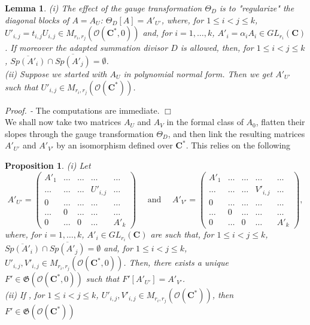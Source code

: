 \documentclass[english]{smfart}
\newtheorem{lemma}[thm]{Lemma}
\newtheorem{prop}[thm]{Proposition}
\numberwithin{equation}{thm}
\def \Pr {\textsl{Proof. - }}
\def\C{{\mathbf C}}
\def\G{{\mathfrak{G}}}
\def\Rw{{\mathcal{O}(\C^{*})}}
\def\Rwg{{\mathcal{O}(\C^{*},0)}}
\def\Th{\Theta}
\begin{document}
\begin{lemma}
(i) The effect of the gauge transformation $\Th_{D}$ is to 
"regularize" the diagonal blocks of $A = A_{U}$:
$\Th_{D}[A] = A'_{U'}$, where, for $1 \leq i < j \leq k$, 
$U'_{i,j} = t_{i,j} U_{i,j} \in M_{r_{i},r_{j}}(\Rwg)$
and, for $i = 1,\ldots,k$, $A'_{i} = \alpha_{i} A_{i} \in GL_{r_{i}}(\C)$.
If moreover the adapted summation divisor $D$ is allowed, then,
for $1 \leq i < j \leq k$, 
$\overline{Sp(A'_{i})} \cap \overline{Sp(A'_{j})} = \emptyset$. \\
(ii) Suppose we started with $A_{U}$ in polynomial normal form.
Then we get $A'_{U'}$ such that $U'_{i,j} \in M_{r_{i},r_{j}}(\Rw)$.
\end{lemma}

\Pr 
The computations are immediate.
\hfill $\Box$ \\

We shall now take two matrices $A_{U}$ and $A_{V}$ in the formal
class of $A_{0}$, flatten their slopes through the gauge transformation
$\Th_{D}$, and then link the resulting matrices $A'_{U'}$ and $A'_{V'}$ 
by an isomorphism defined over $\C^{*}$. This relies on the following

\begin{prop}
(i) Let
$$
A'_{U'} = \begin{pmatrix}
A'_{1}  & \ldots & \ldots & \ldots & \ldots \\
\ldots & \ldots & \ldots  & U'_{i,j} & \ldots \\
0      & \ldots & \ldots   & \ldots & \ldots \\
\ldots & 0 & \ldots  & \ldots & \ldots \\
0      & \ldots & 0       & \ldots & A'_{k}    
\end{pmatrix}
\quad \text{~and~} \quad
A'_{V'} = \begin{pmatrix}
A'_{1}  & \ldots & \ldots & \ldots & \ldots \\
\ldots & \ldots & \ldots  & V'_{i,j} & \ldots \\
0      & \ldots & \ldots   & \ldots & \ldots \\
\ldots & 0 & \ldots  & \ldots & \ldots \\
0      & \ldots & 0       & \ldots & A'_{k}    
\end{pmatrix},
$$
where, for $i = 1,\ldots,k$, $A'_{i} \in GL_{r_{i}}(\C)$ are such that,
for $1 \leq i < j \leq k$, 
$\overline{Sp(A'_{i})} \cap \overline{Sp(A'_{j})} = \emptyset$
and, for $1 \leq i < j \leq k$, 
$U'_{i,j}, V'_{i,j} \in M_{r_{i},r_{j}}(\Rwg)$.
Then, there exists a unique $F' \in \G(\Rwg)$ such that
$F'[A'_{U'}] = A'_{V'}$. \\
(ii) If , for $1 \leq i < j \leq k$, 
$U'_{i,j}, V'_{i,j} \in M_{r_{i},r_{j}}(\Rw)$,
then $F' \in \G(\Rw)$
\end{prop}
\end{document}
